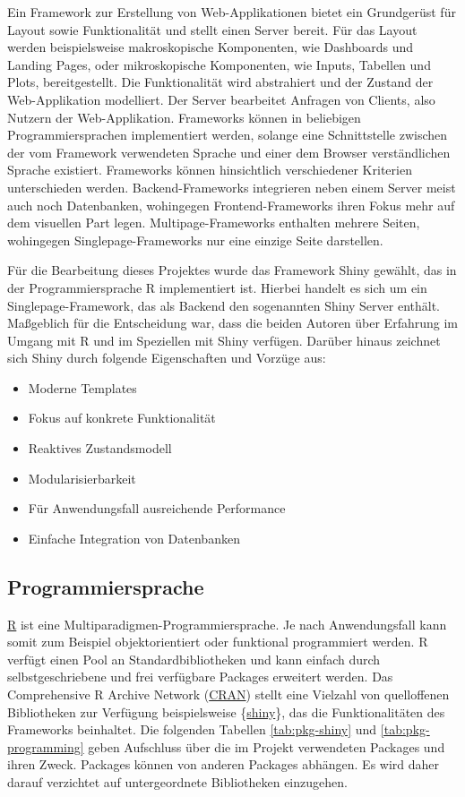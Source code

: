 \documentclass[
]{article}
\providecommand{\tightlist}{%
  \setlength{\itemsep}{0pt}\setlength{\parskip}{0pt}}
\begin{document}
Ein Framework zur Erstellung von Web-Applikationen bietet ein Grundgerüst für Layout sowie Funktionalität und stellt einen Server bereit. Für das Layout werden beispielsweise makroskopische Komponenten, wie Dashboards und Landing Pages, oder mikroskopische Komponenten, wie Inputs, Tabellen und Plots, bereitgestellt. Die Funktionalität wird abstrahiert und der Zustand der Web-Applikation modelliert. Der Server bearbeitet Anfragen von Clients, also Nutzern der Web-Applikation. Frameworks können in beliebigen Programmiersprachen implementiert werden, solange eine Schnittstelle zwischen der vom Framework verwendeten Sprache und einer dem Browser verständlichen Sprache existiert. Frameworks können hinsichtlich verschiedener Kriterien unterschieden werden. Backend-Frameworks integrieren neben einem Server meist auch noch Datenbanken, wohingegen Frontend-Frameworks ihren Fokus mehr auf dem visuellen Part legen. Multipage-Frameworks enthalten mehrere Seiten, wohingegen Singlepage-Frameworks nur eine einzige Seite darstellen.

Für die Bearbeitung dieses Projektes wurde das Framework Shiny gewählt, das in der Programmiersprache R implementiert ist. Hierbei handelt es sich um ein Singlepage-Framework, das als Backend den sogenannten Shiny Server enthält. Maßgeblich für die Entscheidung war, dass die beiden Autoren über Erfahrung im Umgang mit R und im Speziellen mit Shiny verfügen. Darüber hinaus zeichnet sich Shiny durch folgende Eigenschaften und Vorzüge aus:

\begin{itemize}
\tightlist
\item
  Moderne Templates
\item
  Fokus auf konkrete Funktionalität
\item
  Reaktives Zustandsmodell
\item
  Modularisierbarkeit
\item
  Für Anwendungsfall ausreichende Performance
\item
  Einfache Integration von Datenbanken
\end{itemize}

\hypertarget{programmiersprache}{%
\subsection{Programmiersprache}\label{programmiersprache}}

\href{https://www.r-project.org/}{R} ist eine Multiparadigmen-Programmiersprache. Je nach Anwendungsfall kann somit zum Beispiel objektorientiert oder funktional programmiert werden. R verfügt einen Pool an Standardbibliotheken und kann einfach durch selbstgeschriebene und frei verfügbare Packages erweitert werden. Das Comprehensive R Archive Network (\href{https://cran.r-project.org/}{CRAN}) stellt eine Vielzahl von quelloffenen Bibliotheken zur Verfügung beispielsweise \{\href{https://shiny.rstudio.com/}{shiny}\}, das die Funktionalitäten des Frameworks beinhaltet. Die folgenden Tabellen \ref{tab:pkg-shiny} und \ref{tab:pkg-programming} geben Aufschluss über die im Projekt verwendeten Packages und ihren Zweck. Packages können von anderen Packages abhängen. Es wird daher darauf verzichtet auf untergeordnete Bibliotheken einzugehen.
\end{document}
